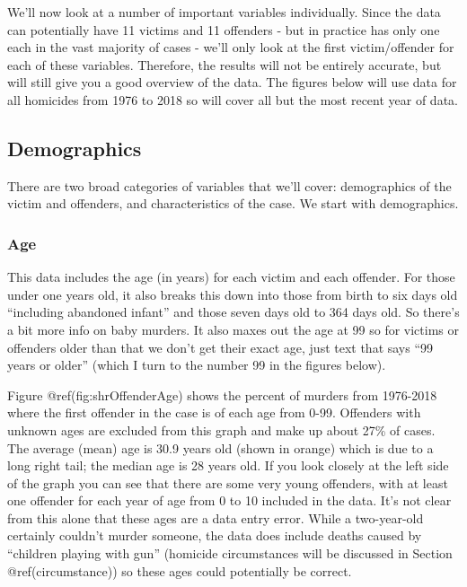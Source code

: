 \documentclass[
  12pt,
  openany]{book}
\begin{document}
We'll now look at a number of important variables individually. Since the data can potentially have 11 victims and 11 offenders - but in practice has only one each in the vast majority of cases - we'll only look at the first victim/offender for each of these variables. Therefore, the results will not be entirely accurate, but will still give you a good overview of the data. The figures below will use data for all homicides from 1976 to 2018 so will cover all but the most recent year of data.

\hypertarget{demographics}{%
\subsection{Demographics}\label{demographics}}

There are two broad categories of variables that we'll cover: demographics of the victim and offenders, and characteristics of the case. We start with demographics.

\hypertarget{age-1}{%
\subsubsection{Age}\label{age-1}}

This data includes the age (in years) for each victim and each offender. For those under one years old, it also breaks this down into those from birth to six days old ``including abandoned infant'' and those seven days old to 364 days old. So there's a bit more info on baby murders. It also maxes out the age at 99 so for victims or offenders older than that we don't get their exact age, just text that says ``99 years or older'' (which I turn to the number 99 in the figures below).

Figure @ref(fig:shrOffenderAge) shows the percent of murders from 1976-2018 where the first offender in the case is of each age from 0-99. Offenders with unknown ages are excluded from this graph and make up about 27\% of cases. The average (mean) age is 30.9 years old (shown in orange) which is due to a long right tail; the median age is 28 years old. If you look closely at the left side of the graph you can see that there are some very young offenders, with at least one offender for each year of age from 0 to 10 included in the data. It's not clear from this alone that these ages are a data entry error. While a two-year-old certainly couldn't murder someone, the data does include deaths caused by ``children playing with gun'' (homicide circumstances will be discussed in Section @ref(circumstance)) so these ages could potentially be correct.
\end{document}
